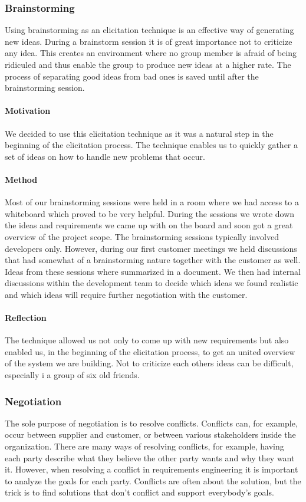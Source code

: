 \documentclass[10pt]{article}
\begin{document}
\subsubsection{Brainstorming}
Using brainstorming as an elicitation technique is an effective way of generating new ideas. During a brainstorm session it is of great importance not to criticize any idea. This creates an environment where no group member is afraid of being ridiculed and thus enable the group to produce new ideas at a higher rate.
The process of separating good ideas from bad ones is saved until after the brainstorming session.

\paragraph{Motivation}
\hfill \break
We decided to use this elicitation technique as it was a natural step in the beginning of the elicitation process. The technique enables us to quickly gather a set of ideas on how to handle new problems that occur.

\paragraph{Method}
\hfill \break
Most of our brainstorming sessions were held in a room where we had access to a whiteboard which proved to be very helpful. During the sessions we wrote down the ideas and requirements we came up with on the board and soon got a great overview of the project scope. The brainstorming sessions typically involved developers only. However, during our first customer meetings we held discussions that had somewhat of a brainstorming nature together with the customer as well. Ideas from these sessions where summarized in a document. We then had internal discussions within the development team to decide which ideas we found realistic and which ideas will require further negotiation with the customer.
\paragraph{Reflection}
\hfill \break
The technique allowed us not only to come up with new requirements but also enabled us, in the beginning of the elicitation process, to get an united overview of the system we are building. Not to criticize each others ideas can be difficult, especially i a group of six old friends.

\subsubsection{Negotiation}
The sole purpose of negotiation is to resolve conflicts. Conflicts can, for example, occur between supplier and customer, or between various stakeholders inside the organization. There are many ways of resolving conflicts, for example, having each party describe what they believe the other party wants and why they want it. However, when resolving a conflict in requirements engineering it is important to analyze the goals for each party. Conflicts are often about the solution, but the trick is to find solutions that don’t conflict and support everybody’s goals.
\end{document}
